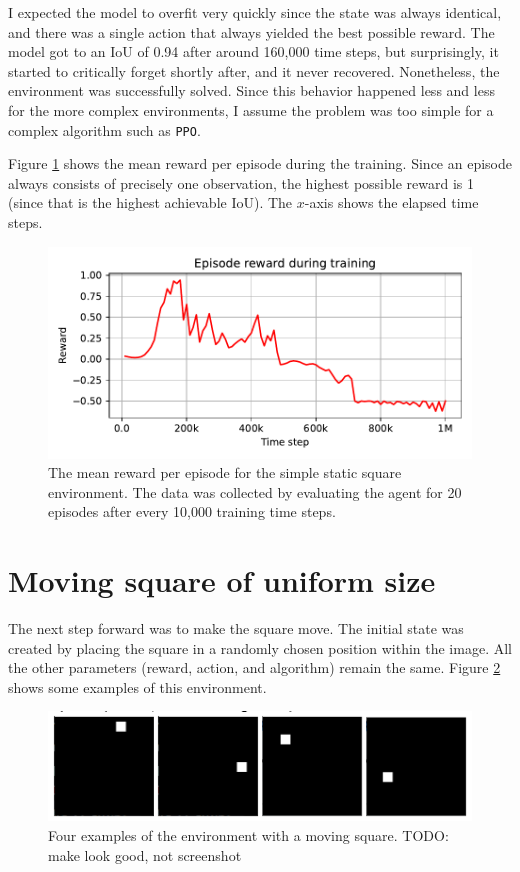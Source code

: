 \documentclass[
  digital,     %
  oneside,     %
  nosansbold,  %
  nocolorbold, %
  lof,         %
  lot,         %
]{fithesis4}
\begin{document}
I expected the model to overfit very quickly since the state was always identical, and there was a single action that always yielded the best possible reward. The model got to an IoU of 0.94 after around 160,000 time steps, but surprisingly, it started to critically forget shortly after, and it never recovered. Nonetheless, the environment was successfully solved. Since this behavior happened less and less for the more complex environments, I assume the problem was too simple for a complex algorithm such as \texttt{PPO}.

Figure \ref{fig:v0_rew} shows the mean reward per episode during the training. Since an episode always consists of precisely one observation, the highest possible reward is 1 (since that is the highest achievable IoU). The $x$-axis shows the elapsed time steps.

\begin{figure}
    \includegraphics[width=1\linewidth]{graphs/v0.pdf}
    \caption{The mean reward per episode for the simple static square environment. The data was collected by evaluating the agent for 20 episodes after every 10,000 training time steps.}
    \label{fig:v0_rew}
\end{figure}

\section{Moving square of uniform size}
The next step forward was to make the square move. The initial state was created by placing the square in a randomly chosen position within the image. All the other parameters (reward, action, and algorithm) remain the same. Figure \ref{fig:env1} shows some examples of this environment.

\begin{figure}
    \includegraphics[width=1\linewidth]{env_examples/env1.png}
    \caption{Four examples of the environment with a moving square. TODO: make look good, not screenshot}
    \label{fig:env1}
\end{figure}
\end{document}
